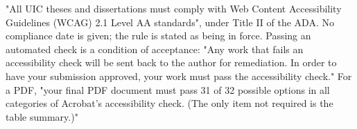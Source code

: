 


%
%
%
\thesisrequiretagging
\thesisrequiredocumentlanguage
{}
	{"All UIC theses and dissertations must comply with Web Content
	 Accessibility Guidelines (WCAG) 2.1 Level AA standards", under Title II of
	 the ADA. No compliance date is given; the rule is stated as being in force.}
	{Passing an automated check is a condition of acceptance: "Any work that
	 fails an accessibility check will be sent back to the author for
	 remediation. In order to have your submission approved, your work must pass
	 the accessibility check." For a PDF, "your final PDF document must pass 31
	 of 32 possible options in all categories of Acrobat's accessibility check.
	 (The only item not required is the table summary.)"}
